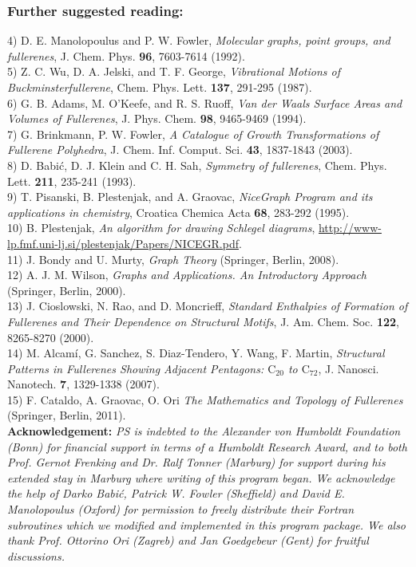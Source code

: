 \documentclass[article,a4paper,twoside]{memoir}
\newcommand{\C}[1]{\ensuremath{\mathrm{C}_{#1}}}
\begin{document}
\subsubsection*{Further suggested reading:}
4) D. E. Manolopoulus and P. W. Fowler, \textit{Molecular graphs, point groups, 
and fullerenes}, J. Chem. Phys. \textbf{96}, 7603-7614 (1992).\\
5) Z. C. Wu, D. A. Jelski, and T. F. George, \textit{Vibrational Motions of
Buckminsterfullerene}, Chem. Phys. Lett. \textbf{137}, 291-295 (1987).\\
6) G. B. Adams, M. O'Keefe, and R. S. Ruoff, \textit{Van der Waals Surface Areas
and Volumes of Fullerenes}, J. Phys. Chem. \textbf{98}, 9465-9469 (1994).\\
7) G. Brinkmann, P. W. Fowler, \textit{A Catalogue of Growth Transformations of Fullerene Polyhedra}, 
J. Chem. Inf. Comput. Sci. \textbf{43}, 1837-1843 (2003).\\
8) D. Babi\'c, D. J. Klein and C. H. Sah, \textit{Symmetry of fullerenes},
Chem. Phys. Lett. \textbf{211}, 235-241 (1993).\\
9) T. Pisanski, B. Plestenjak, and A. Graovac, \textit{NiceGraph Program and its 
applications in chemistry}, Croatica Chemica Acta \textbf{68}, 283-292 (1995).\\
10) B. Plestenjak, \textit{An algorithm for drawing Schlegel diagrams}, \url{http://www-lp.fmf.uni-lj.si/plestenjak/Papers/NICEGR.pdf}.\\
11) J. Bondy and U. Murty, \textit{Graph Theory} (Springer, Berlin, 2008).\\
12) A. J. M. Wilson, \textit{Graphs and Applications. An Introductory Approach} (Springer, Berlin, 2000).\\
13) J. Cioslowski, N. Rao, and D. Moncrieff, \textit{Standard Enthalpies of Formation of Fullerenes and Their
Dependence on Structural Motifs}, J. Am. Chem. Soc. \textbf{122}, 8265-8270 (2000).\\
14) M. Alcam\'i, G. Sanchez, S. Diaz-Tendero, Y. Wang, F. Martin, \textit{Structural Patterns in Fullerenes Showing
Adjacent Pentagons: \C{20} to \C{72}}, J. Nanosci. Nanotech. \textbf{7}, 1329-1338 (2007).\\
15) F. Cataldo, A. Graovac, O. Ori \textit{The Mathematics and Topology of Fullerenes} (Springer, Berlin, 2011).\\

\textbf{Acknowledgement:} \textit{PS is indebted to the Alexander von Humboldt Foundation (Bonn) for financial support 
in terms of a Humboldt Research Award, and to both Prof. Gernot Frenking and 
Dr. Ralf Tonner (Marburg) for support during his extended stay in Marburg where 
writing of this program began. We acknowledge the help of Darko Babi\'c, Patrick 
W. Fowler (Sheffield) and David E. Manolopoulus (Oxford) for permission to freely distribute 
their Fortran subroutines which we modified and implemented in this program package.
We also thank Prof. Ottorino Ori (Zagreb) and Jan Goedgebeur (Gent) for fruitful discussions.}
\end{document}
